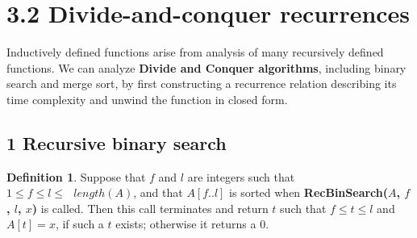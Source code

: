 \documentclass[11pt]{article}
\theoremstyle{plain}%
\theoremstyle{definition}
\newtheorem{defn}{Definition}
\theoremstyle{remark}
\begin{document}
\section*{3.2 Divide-and-conquer recurrences}
Inductively defined functions arise from analysis of many recursively defined functions. We can analyze \textbf{Divide and Conquer algorithms}, including binary search and merge sort, by first constructing a recurrence relation describing its time complexity and unwind the function in closed form.


\subsection*{1 Recursive binary search}
\label{recBinSearch}

\begin{defn}
  \label{correctness of recBinSearch}
  Suppose that $f$ and $l$ are integers such that $1\leq f\leq l\leq \text{ }length(A)$, and that $A[f..l]$ is sorted when \textbf{RecBinSearch($A$, $f$, $l$, $x$)} is called. Then this call terminates and return $t$ such that $f\leq t\leq l$ and $A[t] = x$, if such a $t$ exists; otherwise it returns a 0.
\end{defn}
\end{document}
